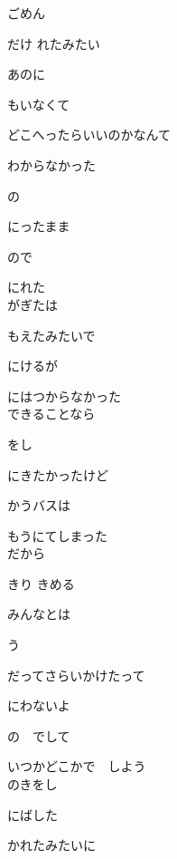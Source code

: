ごめん

だけ れたみたい

あのに

もいなくて

どこへったらいいのかなんて

わからなかった

の

にったまま

ので

にれた
\\

がぎたは

もえたみたいで

にけるが

にはつからなかった
\\

できることなら

をし

にきたかったけど

 かうバスは

もうにてしまった
\\

だから

きり きめる

みんなとは

う

だってさらいかけたって

にわないよ

の　でして

いつかどこかで　しよう
\\

のきをし

にばした

かれたみたいに

